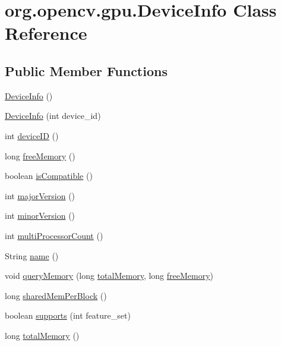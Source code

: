 \hypertarget{classorg_1_1opencv_1_1gpu_1_1_device_info}{}\section{org.\+opencv.\+gpu.\+Device\+Info Class Reference}
\label{classorg_1_1opencv_1_1gpu_1_1_device_info}
\subsection*{Public Member Functions}
\begin{DoxyCompactItemize}
\item 
\mbox{\hyperlink{classorg_1_1opencv_1_1gpu_1_1_device_info_a5cb436ba938d39a75e2c733b66d1153e}{Device\+Info}} ()
\item 
\mbox{\hyperlink{classorg_1_1opencv_1_1gpu_1_1_device_info_a04abf4341b25a45185f51a59be92015f}{Device\+Info}} (int device\+\_\+id)
\item 
int \mbox{\hyperlink{classorg_1_1opencv_1_1gpu_1_1_device_info_ac921536725f63eda83f058062a72f7e2}{device\+ID}} ()
\item 
long \mbox{\hyperlink{classorg_1_1opencv_1_1gpu_1_1_device_info_a39a9ba715da60b8add424d5fdce9590e}{free\+Memory}} ()
\item 
boolean \mbox{\hyperlink{classorg_1_1opencv_1_1gpu_1_1_device_info_a482de66985f08580f48b1f9b08ee402a}{is\+Compatible}} ()
\item 
int \mbox{\hyperlink{classorg_1_1opencv_1_1gpu_1_1_device_info_af5a0e495254888615e72390bdc0bd173}{major\+Version}} ()
\item 
int \mbox{\hyperlink{classorg_1_1opencv_1_1gpu_1_1_device_info_a883c890c1f15c4f63b9ee93d2f6036e2}{minor\+Version}} ()
\item 
int \mbox{\hyperlink{classorg_1_1opencv_1_1gpu_1_1_device_info_a396442905be49edd2619bcd7b356b435}{multi\+Processor\+Count}} ()
\item 
String \mbox{\hyperlink{classorg_1_1opencv_1_1gpu_1_1_device_info_ab8733170714d73e83e32a5700c26f36a}{name}} ()
\item 
void \mbox{\hyperlink{classorg_1_1opencv_1_1gpu_1_1_device_info_a9caa554773a615cdc39ac14fdbb98f1b}{query\+Memory}} (long \mbox{\hyperlink{classorg_1_1opencv_1_1gpu_1_1_device_info_a03283acb91474c553efee75889d26dcd}{total\+Memory}}, long \mbox{\hyperlink{classorg_1_1opencv_1_1gpu_1_1_device_info_a39a9ba715da60b8add424d5fdce9590e}{free\+Memory}})
\item 
long \mbox{\hyperlink{classorg_1_1opencv_1_1gpu_1_1_device_info_a6b74bc6b53fd4b9e9ce8018ccd0e7019}{shared\+Mem\+Per\+Block}} ()
\item 
boolean \mbox{\hyperlink{classorg_1_1opencv_1_1gpu_1_1_device_info_a80747335fc914281c8818309fd9663a4}{supports}} (int feature\+\_\+set)
\item 
long \mbox{\hyperlink{classorg_1_1opencv_1_1gpu_1_1_device_info_a03283acb91474c553efee75889d26dcd}{total\+Memory}} ()
\end{DoxyCompactItemize}
